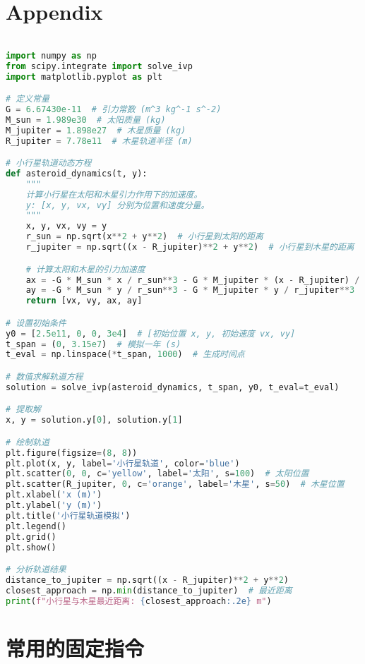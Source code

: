 \documentclass{apmcmthesis}                                             %
\begin{document}
\newpage
\section{Appendix}

\begin{lstlisting}[language=Python, caption=这里写代码的名字]

import numpy as np
from scipy.integrate import solve_ivp
import matplotlib.pyplot as plt

# 定义常量
G = 6.67430e-11  # 引力常数 (m^3 kg^-1 s^-2)
M_sun = 1.989e30  # 太阳质量 (kg)
M_jupiter = 1.898e27  # 木星质量 (kg)
R_jupiter = 7.78e11  # 木星轨道半径 (m)

# 小行星轨道动态方程
def asteroid_dynamics(t, y):
    """
    计算小行星在太阳和木星引力作用下的加速度。
    y: [x, y, vx, vy] 分别为位置和速度分量。
    """
    x, y, vx, vy = y
    r_sun = np.sqrt(x**2 + y**2)  # 小行星到太阳的距离
    r_jupiter = np.sqrt((x - R_jupiter)**2 + y**2)  # 小行星到木星的距离

    # 计算太阳和木星的引力加速度
    ax = -G * M_sun * x / r_sun**3 - G * M_jupiter * (x - R_jupiter) / r_jupiter**3
    ay = -G * M_sun * y / r_sun**3 - G * M_jupiter * y / r_jupiter**3
    return [vx, vy, ax, ay]

# 设置初始条件
y0 = [2.5e11, 0, 0, 3e4]  # [初始位置 x, y, 初始速度 vx, vy]
t_span = (0, 3.15e7)  # 模拟一年 (s)
t_eval = np.linspace(*t_span, 1000)  # 生成时间点

# 数值求解轨道方程
solution = solve_ivp(asteroid_dynamics, t_span, y0, t_eval=t_eval)

# 提取解
x, y = solution.y[0], solution.y[1]

# 绘制轨道
plt.figure(figsize=(8, 8))
plt.plot(x, y, label='小行星轨道', color='blue')
plt.scatter(0, 0, c='yellow', label='太阳', s=100)  # 太阳位置
plt.scatter(R_jupiter, 0, c='orange', label='木星', s=50)  # 木星位置
plt.xlabel('x (m)')
plt.ylabel('y (m)')
plt.title('小行星轨道模拟')
plt.legend()
plt.grid()
plt.show()

# 分析轨道结果
distance_to_jupiter = np.sqrt((x - R_jupiter)**2 + y**2)
closest_approach = np.min(distance_to_jupiter)  # 最近距离
print(f"小行星与木星最近距离: {closest_approach:.2e} m")

\end{lstlisting}







\section{常用的固定指令}
\end{document}
